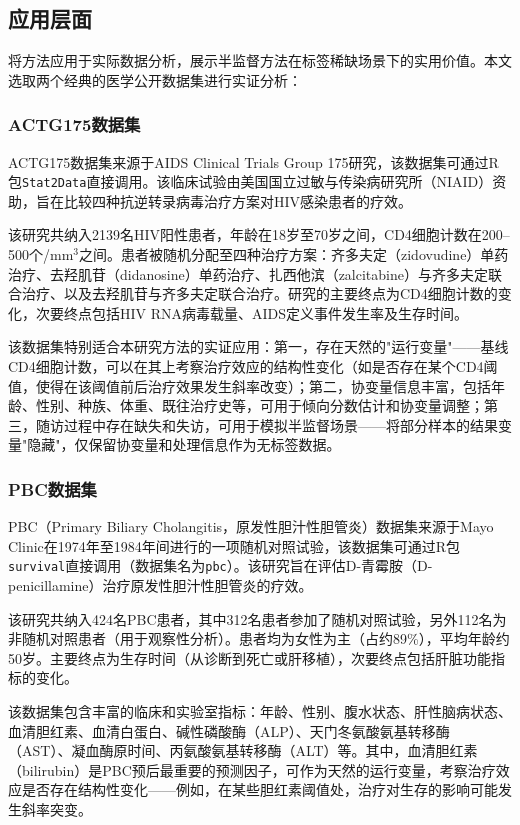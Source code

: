 \documentclass[12pt,a4paper]{ctexart}
\renewcommand*{\cite}{\supercite}
\begin{document}
\subsection{应用层面}

将方法应用于实际数据分析，展示半监督方法在标签稀缺场景下的实用价值。本文选取两个经典的医学公开数据集进行实证分析：

\subsubsection{ACTG175数据集}

ACTG175数据集来源于AIDS Clinical Trials Group 175研究\cite{hammer1996}，该数据集可通过R包\texttt{Stat2Data}直接调用。该临床试验由美国国立过敏与传染病研究所（NIAID）资助，旨在比较四种抗逆转录病毒治疗方案对HIV感染患者的疗效。

该研究共纳入2139名HIV阳性患者，年龄在18岁至70岁之间，CD4细胞计数在200--500个/mm$^3$之间。患者被随机分配至四种治疗方案：齐多夫定（zidovudine）单药治疗、去羟肌苷（didanosine）单药治疗、扎西他滨（zalcitabine）与齐多夫定联合治疗、以及去羟肌苷与齐多夫定联合治疗。研究的主要终点为CD4细胞计数的变化，次要终点包括HIV RNA病毒载量、AIDS定义事件发生率及生存时间。

该数据集特别适合本研究方法的实证应用：第一，存在天然的"运行变量"——基线CD4细胞计数，可以在其上考察治疗效应的结构性变化（如是否存在某个CD4阈值，使得在该阈值前后治疗效果发生斜率改变）；第二，协变量信息丰富，包括年龄、性别、种族、体重、既往治疗史等，可用于倾向分数估计和协变量调整；第三，随访过程中存在缺失和失访，可用于模拟半监督场景——将部分样本的结果变量"隐藏"，仅保留协变量和处理信息作为无标签数据。

\subsubsection{PBC数据集}

PBC（Primary Biliary Cholangitis，原发性胆汁性胆管炎）数据集来源于Mayo Clinic在1974年至1984年间进行的一项随机对照试验\cite{fleming1991}，该数据集可通过R包\texttt{survival}直接调用（数据集名为\texttt{pbc}）。该研究旨在评估D-青霉胺（D-penicillamine）治疗原发性胆汁性胆管炎的疗效。

该研究共纳入424名PBC患者，其中312名患者参加了随机对照试验，另外112名为非随机对照患者（用于观察性分析）。患者均为女性为主（占约89\%），平均年龄约50岁。主要终点为生存时间（从诊断到死亡或肝移植），次要终点包括肝脏功能指标的变化。

该数据集包含丰富的临床和实验室指标：年龄、性别、腹水状态、肝性脑病状态、血清胆红素、血清白蛋白、碱性磷酸酶（ALP）、天门冬氨酸氨基转移酶（AST）、凝血酶原时间、丙氨酸氨基转移酶（ALT）等。其中，血清胆红素（bilirubin）是PBC预后最重要的预测因子，可作为天然的运行变量，考察治疗效应是否存在结构性变化——例如，在某些胆红素阈值处，治疗对生存的影响可能发生斜率突变。
\end{document}
